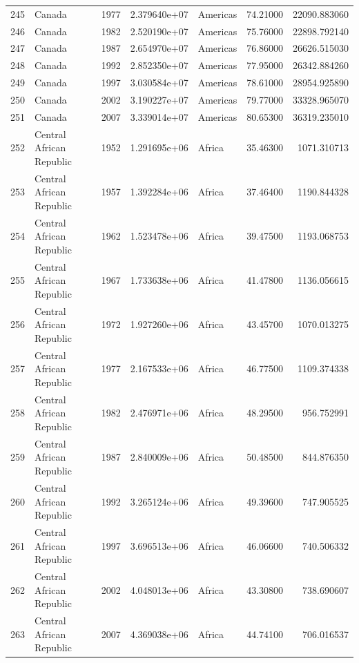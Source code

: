 \documentclass[
  letterpaper,
  DIV=11,
  numbers=noendperiod]{scrreprt}
\begin{document}
\begin{tabular}{llrrlrr}
245  &                    Canada &  1977 &  2.379640e+07 &  Americas &  74.21000 &   22090.883060 \\
246  &                    Canada &  1982 &  2.520190e+07 &  Americas &  75.76000 &   22898.792140 \\
247  &                    Canada &  1987 &  2.654970e+07 &  Americas &  76.86000 &   26626.515030 \\
248  &                    Canada &  1992 &  2.852350e+07 &  Americas &  77.95000 &   26342.884260 \\
249  &                    Canada &  1997 &  3.030584e+07 &  Americas &  78.61000 &   28954.925890 \\
250  &                    Canada &  2002 &  3.190227e+07 &  Americas &  79.77000 &   33328.965070 \\
251  &                    Canada &  2007 &  3.339014e+07 &  Americas &  80.65300 &   36319.235010 \\
252  &  Central African Republic &  1952 &  1.291695e+06 &    Africa &  35.46300 &    1071.310713 \\
253  &  Central African Republic &  1957 &  1.392284e+06 &    Africa &  37.46400 &    1190.844328 \\
254  &  Central African Republic &  1962 &  1.523478e+06 &    Africa &  39.47500 &    1193.068753 \\
255  &  Central African Republic &  1967 &  1.733638e+06 &    Africa &  41.47800 &    1136.056615 \\
256  &  Central African Republic &  1972 &  1.927260e+06 &    Africa &  43.45700 &    1070.013275 \\
257  &  Central African Republic &  1977 &  2.167533e+06 &    Africa &  46.77500 &    1109.374338 \\
258  &  Central African Republic &  1982 &  2.476971e+06 &    Africa &  48.29500 &     956.752991 \\
259  &  Central African Republic &  1987 &  2.840009e+06 &    Africa &  50.48500 &     844.876350 \\
260  &  Central African Republic &  1992 &  3.265124e+06 &    Africa &  49.39600 &     747.905525 \\
261  &  Central African Republic &  1997 &  3.696513e+06 &    Africa &  46.06600 &     740.506332 \\
262  &  Central African Republic &  2002 &  4.048013e+06 &    Africa &  43.30800 &     738.690607 \\
263  &  Central African Republic &  2007 &  4.369038e+06 &    Africa &  44.74100 &     706.016537 \\

\end{tabular}
\end{document}
